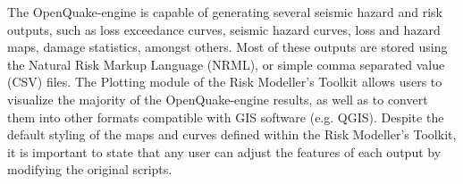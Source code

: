 The OpenQuake-engine is capable of generating several seismic hazard and risk outputs, such as loss exceedance curves, seismic hazard curves, loss and hazard maps, damage statistics, amongst others. Most of these outputs are stored using the Natural Risk Markup Language (NRML), or simple comma separated value (CSV) files. The Plotting module of the Risk Modeller's Toolkit allows users to visualize the majority of the OpenQuake-engine results, as well as to convert them into other formats compatible with GIS software (e.g. QGIS). Despite the default styling of the maps and curves defined within the Risk Modeller's Toolkit, it is important to state that any user can adjust the features of each output by modifying the original scripts.
